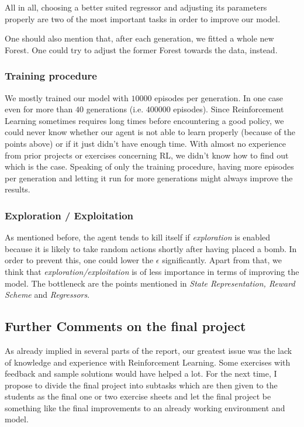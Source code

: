 All in all, choosing a better suited regressor and adjusting its parameters properly are two of the most important tasks in order to improve our model.\par

One should also mention that, after each generation, we fitted a whole new Forest. One could try to adjust the former Forest towards the data, instead.

\subsubsection{Training procedure}
We mostly trained our model with $10000$ episodes per generation. In one case even for more than $40$ generations (i.e. $400000$ episodes). Since Reinforcement Learning sometimes requires long times before encountering a good policy, we could never know whether our agent is not able to learn properly (because of the points above) or if it just didn't have enough time. With almost no experience from prior projects or exercises concerning RL, we didn't know how to find out which is the case. Speaking of only the training procedure, having more episodes per generation and letting it run for more generations might always improve the results.

\subsubsection{Exploration / Exploitation}
As mentioned before, the agent tends to kill itself if \textit{exploration} is enabled because it is likely to take random actions shortly after having placed a bomb. In order to prevent this, one could lower the $\epsilon$ significantly. Apart from that, we think that \textit{exploration/exploitation} is of less importance in terms of improving the model. The bottleneck are the points mentioned in \textit{State Representation, Reward Scheme} and \textit{Regressors}. 

\subsection{Further Comments on the final project}
As already implied in several parts of the report, our greatest issue was the lack of knowledge and experience with Reinforcement Learning. Some exercises with feedback and sample solutions would have helped a lot. For the next time, I propose to divide the final project into subtasks which are then given to the students as the final one or two exercise sheets and let the final project be something like the final improvements to an already working environment and model.

